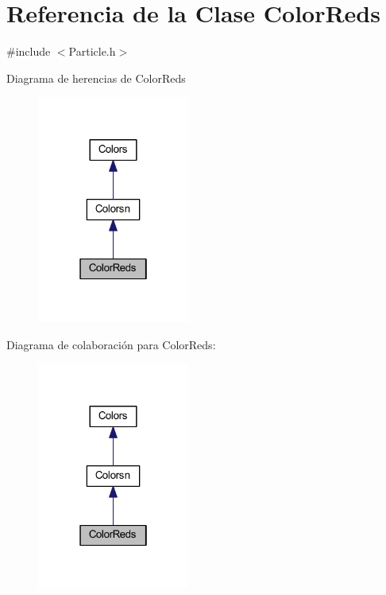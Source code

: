 \hypertarget{class_color_reds}{}\section{Referencia de la Clase Color\+Reds}
\label{class_color_reds}


{\ttfamily \#include $<$Particle.\+h$>$}



Diagrama de herencias de Color\+Reds
\nopagebreak
\begin{figure}[H]
\begin{center}
\leavevmode
\includegraphics[width=142pt]{class_color_reds__inherit__graph}
\end{center}
\end{figure}


Diagrama de colaboración para Color\+Reds\+:
\nopagebreak
\begin{figure}[H]
\begin{center}
\leavevmode
\includegraphics[width=142pt]{class_color_reds__coll__graph}
\end{center}
\end{figure}
